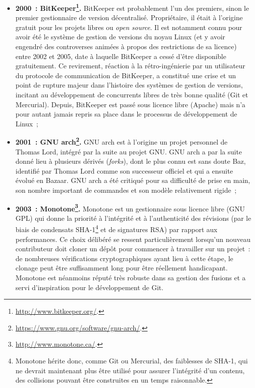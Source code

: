 \begin{itemize}
\item \textbf{2000~:
    BitKeeper\footnote{\url{http://www.bitkeeper.org/}.}.}
  BitKeeper est probablement l'un des premiers, sinon le premier
  gestionnaire de version décentralisé. Propriétaire, il était à
  l'origine gratuit pour les projets libres ou \textit{open
    source}. Il est notamment connu pour avoir été le système de
  gestion de versions du noyau Linux (et y avoir engendré des
  controverses animées à propos des restrictions de sa licence) entre
  2002 et 2005, date à laquelle BitKeeper a cessé d'être disponible
  gratuitement. Ce revirement, réaction à la rétro-ingénierie par un
  utilisateur du protocole de communication de BitKeeper, a constitué
  une crise et un point de rupture majeur dans l'histoire des systèmes
  de gestion de versions, incitant au développement de concurrents
  libres de très bonne qualité (Git et Mercurial). Depuis, BitKeeper
  est passé sous licence libre (Apache) mais n'a pour autant jamais
  repris sa place dans le processus de développement de Linux~;
\item \textbf{2001~: GNU
    arch\footnote{\url{https://www.gnu.org/software/gnu-arch/}.}.} GNU arch est à l'origine un projet personnel de Thomas Lord,
  intégré par la suite au projet GNU. GNU arch a par la suite donné
  lieu à plusieurs dérivés (\textit{forks}), dont le plus connu est
  sans doute Baz, identifié par Thomas Lord comme son successeur
  officiel et qui a ensuite évolué en Bazaar. GNU arch a été critiqué
  pour sa difficulté de prise en main, son nombre important de
  commandes et son modèle relativement rigide~;
\item \textbf{2003~:
    Monotone\footnote{\url{http://www.monotone.ca/}.}.}
  Monotone est un gestionnaire sous licence libre (GNU GPL) qui donne
  la priorité à l'intégrité et à l'authenticité des révisions (par le
  biais de condensats SHA-1\footnote{Monotone hérite donc, comme Git
    ou Mercurial, des faiblesses de SHA-1, qui ne devrait maintenant
    plus être utilisé pour assurer l'intégrité d'un contenu, des
    collisions pouvant être construites en un temps raisonnable.} et
  de signatures RSA) par rapport aux performances. Ce choix délibéré
  se ressent particulièrement lorsqu'un nouveau contributeur doit
  cloner un dépôt pour commencer à travailler sur un projet~: de
  nombreuses vérifications cryptographiques ayant lieu à cette étape,
  le clonage peut être suffisamment long pour être réellement
  handicapant. Monotone est néanmoins réputé très robuste dans sa
  gestion des fusions et a servi d'inspiration pour le développement
  de Git.
\end{itemize}

